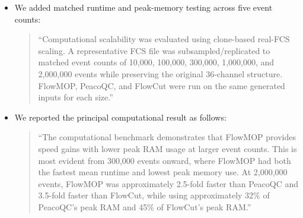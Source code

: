 \documentclass[
  11pt,
  a4paper,
]{article}
\begin{document}
\begin{itemize}
  \begin{quote}
  ``These measurements were obtained using local non-distributed
  execution and therefore demonstrate the performance of the tested
  implementations, not a distributed-computing speedup.''
  \end{quote}

  \begin{quote}
  ``Among the three evaluated decision structures, only FlowMOP exposes
  an inherently channel-parallel within-sample computation. After shared
  acquisition bins are defined, each eligible fluorescence channel
  independently establishes its reference, produces a fixed-shape
  time-bin summary, and applies smoothing and MAD filtering;
  cross-channel coordination occurs only in the final parameter vote.
  PeacoQC instead performs data-dependent peak identification and
  reconciliation across bin-channel combinations, while FlowCut applies
  adjacent-segment, contiguous-region, file-wide, and conditional rerun
  decisions {[}5,6{]}. Their suboperations and separate files can be
  parallelised, but their complete within-sample decision pipelines
  cannot be expressed as the same independent channel-wise reduction
  without changing their decision rules. Porting either implementation
  to another language or scheduling framework would therefore not remove
  these structural dependencies. This structural distinction, together
  with FlowMOP's earlier data reduction, fewer full-data passes, and
  smaller intermediate state, is consistent with its lower runtime and
  memory use in our benchmarks, although the benchmark does not
  independently establish causation.''
  \end{quote}
\item
  We added matched runtime and peak-memory testing across five event
  counts:

  \begin{quote}
  ``Computational scalability was evaluated using clone-based real-FCS
  scaling. A representative FCS file was subsampled/replicated to
  matched event counts of 10,000, 100,000, 300,000, 1,000,000, and
  2,000,000 events while preserving the original 36-channel structure.
  FlowMOP, PeacoQC, and FlowCut were run on the same generated inputs
  for each size.''
  \end{quote}
\item
  We reported the principal computational result as follows:

  \begin{quote}
  ``The computational benchmark demonstrates that FlowMOP provides speed
  gains with lower peak RAM usage at larger event counts. This is most
  evident from 300,000 events onward, where FlowMOP had both the fastest
  mean runtime and lowest peak memory use. At 2,000,000 events, FlowMOP
  was approximately 2.5-fold faster than PeacoQC and 3.5-fold faster
  than FlowCut, while using approximately 32\% of PeacoQC's peak RAM and
  45\% of FlowCut's peak RAM.''
  \end{quote}
\end{itemize}
\end{document}
